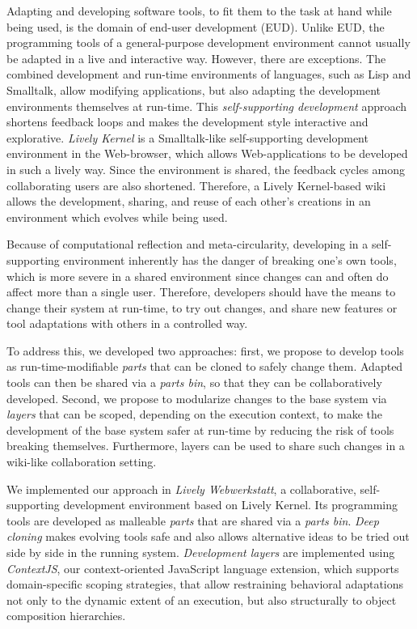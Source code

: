 
Adapting and developing software tools, to fit them to the task at hand while being used, is the domain of end-user development (EUD). Unlike EUD, the programming tools of a general-purpose development environment cannot usually be adapted in a live and interactive way.  
However, there are exceptions. The combined development and run-time environments of languages, such as Lisp and Smalltalk, allow modifying applications, but also adapting the development environments themselves at run-time. This \emph{self-supporting development} approach shortens feedback loops and makes the development style interactive and explorative.
\emph{Lively Kernel} is a Smalltalk-like self-supporting development environment in the Web-browser, which allows Web-applications to be developed in such a lively way. 
Since the environment is shared, the feedback cycles among collaborating users are also shortened. 
Therefore, a Lively Kernel-based wiki allows the development, sharing, and reuse of each other's creations in an environment which evolves while being used.

Because of computational reflection and meta-circularity, developing in a self-supporting environment inherently has the danger of breaking one's own tools, which is more severe in a shared environment since changes can and often do affect more than a single user.
Therefore, developers should have the means to change their system at run-time, to try out changes, and share new features or tool adaptations with others in a controlled way. 

To address this,  we developed two approaches: first, we propose to develop tools as run-time-modifiable \emph{parts} that can be cloned to safely change them. Adapted tools can then be shared via a \emph{parts bin}, so that they can be collaboratively developed. Second, we propose to modularize changes to the base system via \emph{layers} that can be scoped, depending on the execution context, to make the development of the base system safer at run-time by reducing the risk of tools breaking themselves. Furthermore, layers can be used to share such changes in a wiki-like collaboration setting.

We implemented our approach in \emph{Lively Webwerkstatt}, a collaborative, self-supporting development environment based on Lively Kernel. 
Its programming tools are developed as malleable \emph{parts} that are shared via a \emph{parts bin}. 
\emph{Deep cloning} makes evolving tools safe and also allows alternative ideas to be tried out side by side in the running system.
\emph{Development layers} are implemented using \emph{ContextJS}, our context-oriented JavaScript language extension, which supports domain-specific scoping strategies, that allow restraining behavioral adaptations not only to the dynamic extent of an execution, but also structurally to object composition hierarchies. 

